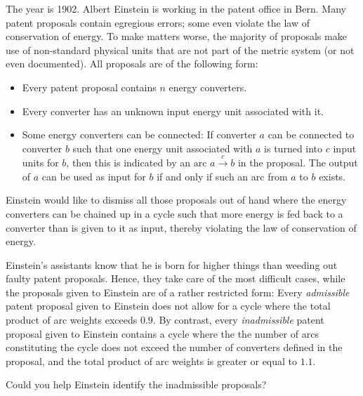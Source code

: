 The year is 1902. Albert Einstein is working in the patent office in Bern.
Many patent proposals contain egregious errors; some even violate the law of conservation of energy.
To make matters worse, the majority of proposals make use of non-standard 
physical units that are not part of the metric system (or not even documented).
All proposals are of the following form:

\begin{itemize}
	\item Every patent proposal contains $n$ energy converters.
	\item Every converter has an unknown input energy unit associated with it.
	\item Some energy converters can be connected: If converter $a$ can be connected to 
	      converter $b$ such that one energy unit associated with $a$ is turned into 
	      $c$ input units for $b$, then this is indicated by an arc 
	      $a \overset{c}{\longrightarrow} b$ in the proposal. 
	      The output of $a$ can be used as input for $b$ 
	      if and only if such an arc from $a$ to $b$ exists.
\end{itemize}
Einstein would like to dismiss all those proposals out of hand where the energy 
converters can be chained up in a cycle such that more energy is fed back to a converter 
than is given to it as input, thereby violating the law of conservation of energy.

Einstein's assistants know that he is born for higher things than weeding out faulty 
patent proposals. Hence, they take care of the most difficult cases, while 
the proposals given to Einstein are of a rather restricted form: 
Every \textit{admissible} patent proposal given to Einstein 
does not allow for a cycle where the total product of arc weights exceeds $0.9$.
By contrast, every \textit{inadmissible} patent proposal given to Einstein contains a cycle 
where the the number of arcs constituting the cycle does not exceed the number of converters defined in the proposal, 
and the total product of arc weights is greater or equal to $1.1$. 

Could you help Einstein identify the inadmissible proposals?
